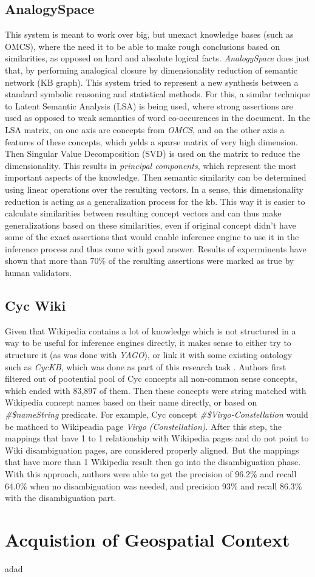\subsection{AnalogySpace}
This system is meant to work over big, but unexact knowledge bases 
(such as OMCS), where the need it to be able to make rough conclusions based
on similarities, as opposed on hard and absolute logical facts. 
\emph{AnalogySpace} does just that, by performing analogical closure by
dimensionality reduction of semantic network (KB graph)\parencite{Speer2008}. 
This system tried to represent a new synthesis between a standard symbolic 
reasoning and statistical methods. For this, a similar technique to Latent
Semantic Analysis (LSA) is being used, where strong assertions are used as
opposed to weak semantics of word co-occurences in the document. In the 
LSA matrix, on one axis are concepts from \emph{OMCS}, and on the other
axis a features of these concepts, which yelds a sparse matrix of very
high dimension. Then Singular Value Decomposition (SVD) is used on the matrix
to reduce the dimensionality. This results in \emph{principal components},
which represent the most important aspects of the knowledge. Then semantic
similarity can be determined using linear operations over the resulting vectors.
In a sense, this dimensionality reduction is acting as a generalization process
for the kb. This way it is easier to calculate similarities between resulting
concept vectors and can thus make generalizations based on these similarities,
even if original concept didn't have some of the exact assertions that would
enable inference engine to use it in the inference process and thus come with
good answer. 
Results of experminents have shown that more than 70\% of the resulting 
assertions were marked as true by human validators.

\subsection{Cyc Wiki}
Given that Wikipedia contains a lot of knowledge which is not structured in 
a way to be useful for inference engines directly, it makes sense to either try
to structure it (as was done with \emph{YAGO}), or link it with some existing
ontology such as \emph{CycKB}, which was done as part of this research task
\parencite{Medelyan2008}.
Authors first filtered out of pootential pool of Cyc concepts all non-common 
sense concepts, which ended with 83,897 of them. Then these concepts were
string matched with Wikipedia concept names based on their name directly,
or based on \emph{\#\$nameString} predicate. For example, Cyc concept
\emph{\#\$Virgo-Constellation} would be mathced to Wikipeadia page 
\emph{Virgo (Constellation)}. After this step, the mappings that have 1 to 1
relationship with Wikipedia pages and do not point to Wiki disambiguation pages,
are considered properly aligned. But the mappings that have more than 1 
Wikipedia result then go into the disambiguation phase. With this approach,
authors were able to get the precision of 96.2\% and recall 64.0\% when no 
disambiguation was needed, and precision 93\% and recall 86.3\% with the 
disambiguation part.


\section{Acquistion of Geospatial Context}
adad
